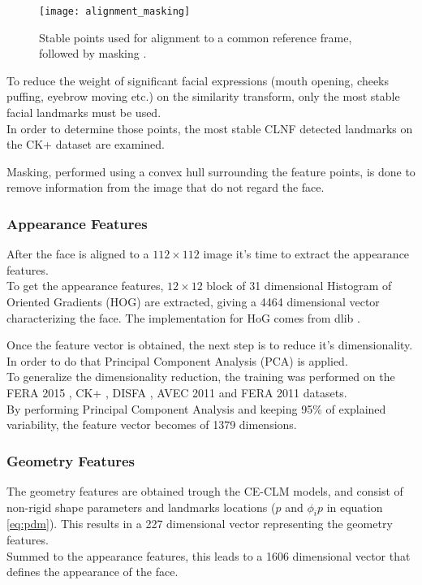 \begin{figure}[H]
	\centering
	\texttt{[image: alignment\_masking]}
	\caption{Stable points used for alignment to a common reference frame, followed by masking \cite{Baltru2015}.}
	\label{fig:alignment_masking}
\end{figure}

To reduce the weight of significant facial expressions (mouth opening, cheeks puffing, eyebrow moving etc.) on the similarity transform, only the most stable facial landmarks must be used. \\
In order to determine those points, the most stable CLNF detected landmarks on the CK+ dataset \cite{CK+} are examined.

Masking, performed using a convex hull surrounding the feature points, is done to remove information from the image that do not regard the face.

\subsubsection{Appearance Features}
After the face is aligned to a $112 \times 112$ image it's time to extract the appearance features. \\
To get the appearance features, $12 \times 12$ block of 31 dimensional Histogram of Oriented Gradients (HOG) are extracted, giving a 4464 dimensional vector characterizing the face. The implementation for HoG comes from dlib \cite{dlib}.

Once the feature vector is obtained, the next step is to reduce it's dimensionality. In order to do that Principal Component Analysis (PCA) is applied. \\
To generalize the dimensionality reduction, the training was performed on the FERA 2015 \cite{FERA15}, CK+ \cite{CK+}, DISFA \cite{DISFA}, AVEC 2011 \cite{AVEC11} and FERA 2011 \cite{FERA11} datasets. \\
By performing Principal Component Analysis and keeping 95\% of explained variability, the feature vector becomes of 1379 dimensions.

\subsubsection{Geometry Features}
The geometry features are obtained trough the CE-CLM models, and consist of non-rigid shape parameters and landmarks locations ($p$ and $ \phi_i p$ in equation \ref{eq:pdm}). This results in a 227 dimensional vector representing the geometry features.\\
Summed to the appearance features, this leads to a 1606 dimensional vector that defines the appearance of the face.

